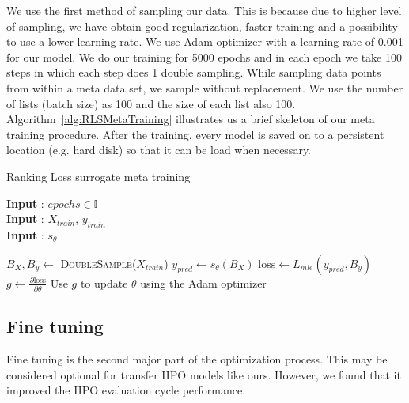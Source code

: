 \documentclass[12pt, twoside, ngerman]{report}
\begin{document}
We use the first method of sampling our data.
This is because due to higher level of sampling,  we have obtain good regularization,
faster training and a possibility to use a lower learning rate.
We use Adam optimizer with a learning rate of 0.001 for our model.
We do our training for 5000 epochs and in each epoch we take 100 steps in which each step does 1 double sampling.
While sampling data points from within a meta data set, we sample without replacement.
We use the number of lists (batch size) as 100 and the size of each list also 100.
Algorithm~\ref{alg:RLSMetaTraining} illustrates us a brief skeleton of our meta training procedure.
After the training,  every model is saved on to a persistent location (e.g. hard disk) so that it can be load when necessary.

\begin{algorithm}[h]
\caption{Ranking Loss surrogate meta training}
\label{alg:RLSMetaTraining}
\hspace*{\algorithmicindent} \textbf{Input} : $epochs \in \mathbb{I}$ \\
 \hspace*{\algorithmicindent} \textbf{Input} : $X_{train}$,  $y_{train}$   \\
\hspace*{\algorithmicindent} \textbf{Input} : $s_{\theta}$ 
\begin{algorithmic}[1]
                \State $B_{X}, B_{y} \gets$ \textsc{DoubleSample}($X_{train}$) 
                \State $y_{pred} \gets s_{\theta}(B_{X})$
                \State $\textrm{loss} \gets L_{mle}(y_{pred},  B_{y}) $
                \State $g \gets \frac{\partial \textrm{loss}}{\partial \theta}$ 
                \State Use $g$ to update $\theta$ using the Adam optimizer
            \EndFor
    \EndFor
\EndProcedure
\end{algorithmic}
\end{algorithm}



\subsection{Fine tuning}\label{sec:rlfinetune}
Fine tuning is the second major part of the optimization process.
This may be considered optional for transfer HPO models like ours.
However,  we found that it improved the HPO evaluation cycle performance.
\end{document}
